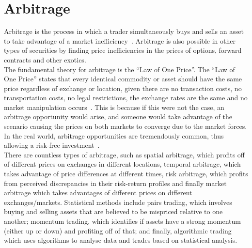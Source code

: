 \section{Arbitrage}
Arbitrage is the process in which a trader simultaneously buys and sells an asset to take advantage of a market inefficiency~\cite{businessinsightsblog_2021}. Arbitrage is also possible in other types of securities by finding price inefficiencies in the prices of options, forward contracts and other exotics.
\\[3mm]
The fundamental theory for arbitrage is the ``Law of One Price''. The ``Law of One Price'' states that every identical commodity or asset should have the same price regardless of exchange or location, given there are no transaction costs, no transportation costs, no legal restrictions, the exchange rates are the same and no market manipulation occurs~\cite{noauthor_law_nodate}. This is because if this were not the case, an arbitrage opportunity would arise, and someone would take advantage of the scenario causing the prices on both markets to converge due to the market forces. In the real world, arbitrage opportunities are tremendously common, thus allowing a risk-free investment~\cite{10.2307/1828075, RICHARDSON1978341}.
\\[3mm]
There are countless types of arbitrage, such as spatial arbitrage, which profits off of different prices on exchanges in different locations, temporal arbitrage, which takes advantage of price differences at different times, risk arbitrage, which profits from perceived discrepancies in their risk-return profiles and finally market arbitrage which takes advantages of different prices on different exchanges/markets. Statistical methods include pairs trading, which involves buying and selling assets that are believed to be mispriced relative to one another; momentum trading, which identifies if assets have a strong momentum (either up or down) and profiting off of that; and finally, algorithmic trading which uses algorithms to analyse data and trades based on statistical analysis.


